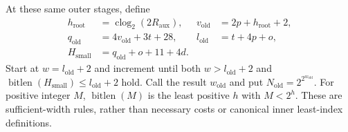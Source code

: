 At these same outer stages, define
\begin{align*}
 h_{\mathrm{root}}&=\operatorname{clog}_2(2R_{\mathrm{aux}}),&
 v_{\mathrm{old}}&=2p+h_{\mathrm{root}}+2,\\
 q_{\mathrm{old}}&=4v_{\mathrm{old}}+3t+28,&
 l_{\mathrm{old}}&=t+4p+o,\\
 H_{\mathrm{small}}&=q_{\mathrm{old}}+o+11+4d.
\end{align*}
Start at $w=l_{\mathrm{old}}+2$ and increment until both
$w>l_{\mathrm{old}}+2$ and
$\operatorname{bitlen}(H_{\mathrm{small}})\le l_{\mathrm{old}}+2$ hold.
Call the result $w_{\mathrm{old}}$ and put
$N_{\mathrm{old}}=2^{2^{w_{\mathrm{old}}}}$.
For positive integer $M$, $\operatorname{bitlen}(M)$ is the least positive
$h$ with $M<2^h$. These are sufficient-width rules, rather than necessary
costs or canonical inner least-index definitions.

